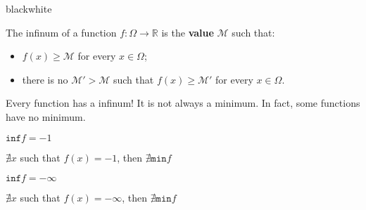 \begin{remark}{black}{white}
    \begin{definition}[infimum]
        The infinum of a function \( f : \Omega \rightarrow \mathbb{R} \) is the \textbf{value} \( \mathcal{M} \) such that:
        \begin{itemize}
            \item \( f(x) \geq \mathcal{M} \) for every \( x \in \Omega \);
            \item there is no \( \mathcal{M}' > \mathcal{M} \) such that \( f(x) \geq \mathcal{M}' \) for every \( x \in \Omega \). 
        \end{itemize}
    \end{definition}
\end{remark}

Every function has a infinum! It is not always a minimum. In fact, some functions have no minimum.

\begin{minipage}{0.5\textwidth}
    \begin{center}
        \( \mathtt{inf} f = -1 \)

        \( \nexists x \) such that \( f(x) = -1 \), then \( \nexists \mathtt{min} f \)
    \end{center}
\end{minipage}
\begin{minipage}{0.5\textwidth}

    \begin{center}
        \( \mathtt{inf} f = -\infty \)

        \( \nexists x \) such that \( f(x) = -\infty \), then \( \nexists \mathtt{min} f \)
    \end{center}
\end{minipage}

